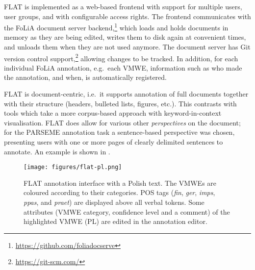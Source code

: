 \documentclass[output=paper,
modfonts,
]{langscibook}
\begin{document}
FLAT is implemented as a web-based frontend with support for multiple users, user groups, and with configurable access rights. The frontend communicates with the FoLiA document server
backend,\footnote{\scriptsize{\url{https://github.com/foliadocserve}}} which loads and holds documents in memory as they are being edited, writes them to disk again at convenient times, and unloads them when they are not used anymore. The document server has Git version control support,\footnote{\scriptsize{\url{https://git-scm.com/}}} allowing changes to be tracked. In addition, for each individual FoLiA annotation, %
e.g.\ each VMWE, %
information  such as who made the annotation, and when, is automatically registered.

FLAT is document-centric, i.e.\ it supports annotation of full documents together with their structure  (headers, bulleted lists, figures, etc.). 
This %
contrasts with tools which take a more corpus-based approach with keyword-in-context visualisation. FLAT does allow for various other \emph{perspectives} on 
the document; for the PARSEME annotation task a sentence-based perspective was chosen, presenting users with one or more pages of clearly delimited sentences to annotate. An example is shown in .

\begin{figure}
\texttt{[image: figures/flat-pl.png]}
\caption{FLAT annotation interface with a Polish text. The VMWEs are coloured according to their categories. POS tags (\textit{fin}, \textit{ger}, \textit{imps}, \textit{ppas}, and \textit{praet}) are displayed above all verbal tokens. Some attributes (VMWE category, confidence level and a comment) of the highlighted VMWE (PL)  are edited in the annotation editor.}
\label{fig:flat1}
\end{figure}
\end{document}
